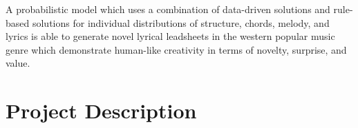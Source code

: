\documentclass[11pt,phd]{byuprop}
\begin{document}
A probabilistic model which uses a combination of data-driven solutions and rule-based solutions for individual distributions of structure, chords, melody, and lyrics is able to generate novel lyrical leadsheets in the western popular music genre which demonstrate human-like creativity in terms of novelty, surprise, and value.

\section{Project Description}

%
%
%
%
\end{document}
